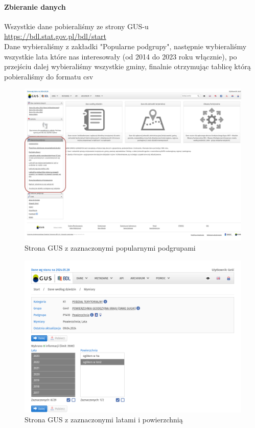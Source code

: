 \documentclass[12pt]{article}
\begin{document}
\paragraph{Zbieranie danych}
Wszystkie dane pobieraliśmy ze strony GUS-u \\
\href{https://bdl.stat.gov.pl/bdl/start}{https://bdl.stat.gov.pl/bdl/start} \\ 
Dane wybieraliśmy z zakładki "Popularne podgrupy", następnie wybieraliśmy wszystkie lata które nas 
interesowały (od 2014 do 2023 roku włącznie), po przejściu dalej wybieraliśmy wszystkie gminy, 
finalnie otrzymując tablicę którą pobieraliśmy do formatu csv \\ 
\begin{figure}[H]
    \caption{Strona GUS z zaznaczonymi popularnymi podgrupami}
    \centering
    \includegraphics[width=1.0\textwidth]{gus}
    \end{figure}
\begin{figure}[H]
    \caption{Strona GUS z zaznaczonymi latami i powierzchnią}
    \centering
    \includegraphics[width=1.0\textwidth]{dane3}
\end{figure}
\end{document}
